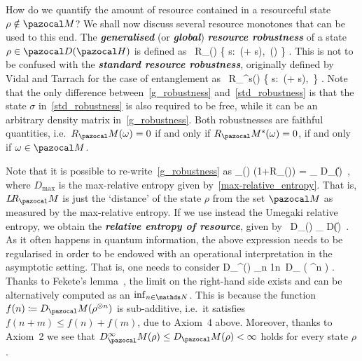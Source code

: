 \documentclass[11pt,notitlepage,tightenlines,nofootinbib,superscriptaddress]{revtex4-1}
\newcommand{\deff}[1]{\textbf{\emph{#1}}}
\begin{document}
How do we quantify the amount of resource contained in a resourceful state $\rho\notin \MM$? We shall now discuss several resource monotones that can be used to this end. The \deff{generalised} (or \deff{global}) \deff{resource robustness}  
of a state $\rho\in \D(\HH)$ is defined as~\cite{VidalTarrach, harrow_2003}
\bb
R_\MM(\rho) \coloneqq \min\left\{ s:\, \left(\rho + s\sigma \right)\in \MM,\, \sigma \in \D(\HH) \right\} .
\label{g_robustness}
\ee
This is not to be confused with the \deff{standard resource robustness}, originally defined by Vidal and Tarrach for the case of entanglement as~\cite{VidalTarrach}
\bb
R_\MM^s(\rho) \coloneqq \min\left\{ s:\, \left(\rho + s\sigma \right)\in \MM,\, \sigma \in \MM \right\} .
\label{std_robustness}
\ee
Note that the only difference between~\eqref{g_robustness} and~\eqref{std_robustness} is that the state $\sigma$ in~\eqref{std_robustness} is also required to be free, while it can be an arbitrary density matrix in~\eqref{g_robustness}. Both robustnesses are faithful quantities, i.e.\ $R_\MM(\omega)=0$ if and only if $R_\MM^s(\omega)=0$, if and only if $\omega\in \MM$.

Note that it is possible to re-write~\eqref{g_robustness} as
\bb
\LR_\MM(\rho) \coloneqq \log\left(1+R_\MM(\rho)\right) = \min_{\sigma\in \MM} D_{\max}(\rho\|\sigma)\, ,
\ee
where $D_{\max}$ is the max-relative entropy given by~\eqref{max-relative_entropy}. That is, $\LR_\MM$ is just the `distance' of the state $\rho$ from the set $\MM$ as measured by the max-relative entropy. If we use instead the Umegaki relative entropy, we obtain the \deff{relative entropy of resource}, given by~\cite{Vedral1997} 
\bb
D_\MM(\rho) \coloneqq \min_{\sigma\in \MM} D(\rho\|\sigma)\, .
\label{relative_entropy_resource}
\ee
As it often happens in quantum information, the above expression needs to be regularised in order to be endowed with an operational interpretation in the asymptotic setting. That is, one needs to consider
\bb
D_\MM^\infty(\rho) \coloneqq \lim_{n\to\infty} \frac1n\, D_ \MM\left( \rho^{\otimes n} \right) .
\label{regularised_relative_entropy_resource}
\ee
Thanks to Fekete's lemma~\cite{Fekete1923}, the limit on the right-hand side exists and can be alternatively computed as an $\inf_{n\in\N}$. This is because the function $f(n) \coloneqq D_\MM(\rho^{\otimes n})$ is sub-additive, i.e.\ it satisfies $f(n+m)\leq f(n)+f(m)$, due to Axiom~4 above. Moreover, thanks to Axiom~2 we see that $D^\infty_\MM(\rho) \leq D_\MM(\rho)<\infty$ holds for every state $\rho$.
\end{document}
